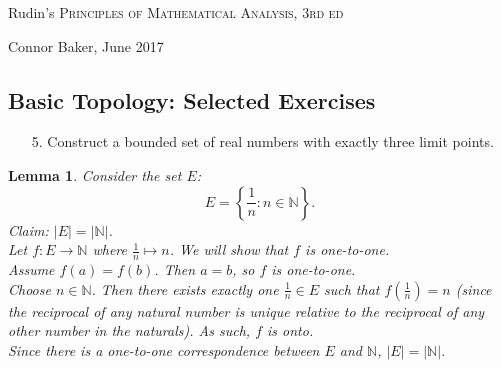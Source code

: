 \documentclass[10pt]{article}
\theoremstyle{definition}
\theoremstyle{plain}
\newtheorem{lemma}[equation]{Lemma}
\newcommand{\N}{\mathbb{N}}
\begin{document}

\begin{center}
  {\Large Rudin's \textsc{Principles of Mathematical Analysis, 3rd ed}}

  {\large Connor Baker, June 2017}

  \subsection*{Basic Topology: Selected Exercises}
\end{center}
\begin{enumerate}
\item[5.] Construct a bounded set of real numbers with exactly three limit points.
\end{enumerate}

\begin{lemma}
Consider the set $E$:
$$E = \left\{\frac{1}{n}: n\in\N\right\}.$$
Claim: $|E|=|\N|$. \\

Let $f:E\rightarrow\N$ where $\frac{1}{n} \mapsto n$. We will show that $f$ is one-to-one. \\
Assume $f(a)=f(b)$. Then $a=b$, so $f$ is one-to-one. \\
Choose $n\in\N$. Then there exists exactly one $\frac{1}{n}\in E$ such that $f(\frac{1}{n}) = n$ (since the reciprocal of any natural number is unique relative to the reciprocal of any other number in the naturals). As such, $f$ is onto. \\

Since there is a one-to-one correspondence between $E$ and $\N$, $|E|=|\N|$.
\end{lemma}
\end{document}
